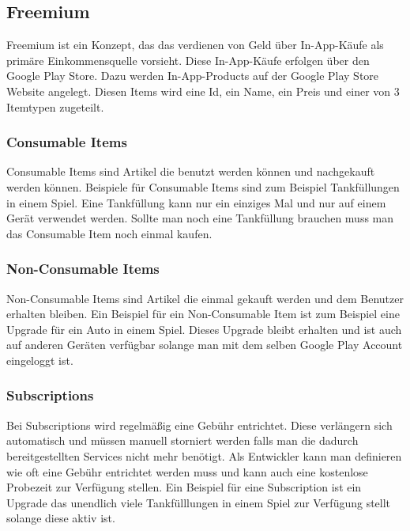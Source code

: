 \documentclass[FIPLY_base.tex]{subfiles}
\author{Andreas Denkmayr}
\date{25. Februar 2016}
\begin{document}
\subsection{Freemium}
Freemium ist ein Konzept, das das verdienen von Geld über In-App-Käufe als primäre Einkommensquelle vorsieht.
Diese In-App-Käufe erfolgen über den Google Play Store. \newline
Dazu werden In-App-Products auf der Google Play Store Website angelegt.
Diesen Items wird eine Id, ein Name, ein Preis und einer von 3 Itemtypen zugeteilt. 
\cite{yFreemium} 

\subsubsection{Consumable Items}
Consumable Items sind Artikel die benutzt werden können und nachgekauft werden können. 
Beispiele für Consumable Items sind zum Beispiel Tankfüllungen in einem Spiel.
Eine Tankfüllung kann nur ein einziges Mal und nur auf einem Gerät verwendet werden. Sollte man noch eine Tankfüllung brauchen muss man das Consumable Item noch einmal kaufen. 

\subsubsection{Non-Consumable Items} 
Non-Consumable Items sind Artikel die einmal gekauft werden und dem Benutzer erhalten bleiben.
Ein Beispiel für ein Non-Consumable Item ist zum Beispiel eine Upgrade für ein Auto in einem Spiel.
Dieses Upgrade bleibt erhalten und ist auch auf anderen Geräten verfügbar solange man mit dem selben Google Play Account eingeloggt ist. 

\subsubsection{Subscriptions}
Bei Subscriptions wird regelmäßig eine Gebühr entrichtet.
Diese verlängern sich automatisch und müssen manuell storniert werden falls man die dadurch bereitgestellten Services nicht mehr benötigt.
Als Entwickler kann man definieren wie oft eine Gebühr entrichtet werden muss und kann auch eine kostenlose Probezeit zur Verfügung stellen. 
Ein Beispiel für eine Subscription ist ein Upgrade das unendlich viele Tankfülllungen in einem Spiel zur Verfügung stellt solange diese aktiv ist.
\end{document}
